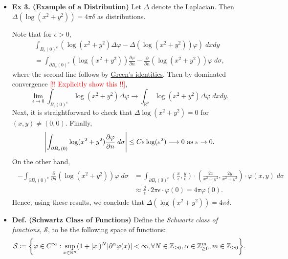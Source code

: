 \documentclass{article}
\begin{document}
\begin{itemize}
 	\item \textbf{Ex 3. (Example of a Distribution)} Let $\Delta$ denote the Laplacian. Then $\Delta(\log(x^{2} + y^{2})) = 4\pi \delta$ as distributions. 
 	
 		{\color{blue}
 			Note that for $\epsilon > 0$, 
 				\begin{multline}
					\int_{B_{\epsilon}(0)^{c}}\left(\log(x^{2} + y^{2})\Delta \varphi - \Delta(\log(x^{2} + y^{2}))\varphi\right)\;dx dy \\ = \int_{\partial B_{\epsilon}(0)^{c}}\left(\log(x^{2} + y^{2})\right)\frac{\partial \varphi}{\partial n} - \frac{\partial}{\partial n}\left(\log(x^{2} + y^{2})\right)\varphi\;d\sigma, 
 				\end{multline}
 			where the second line follows by \href{http://en.wikipedia.org/wiki/Green\%27s\_identities}{Green's identities}. Then by dominated convergence \textcolor{red}{[!! Explicitly show this !!]}, 
 				\begin{equation}
 					\lim_{\epsilon \to 0}\int_{B_{\epsilon}(0)^{c}}\log(x^{2} +  y^{2})\Delta \varphi \longrightarrow \int_{\mathbb{R}^{2}}\log(x^{2} +y^{2})\Delta\varphi\;dx dy. 
 				\end{equation}
 			Next, it is straightforward to check that $\Delta \log(x^{2} + y^{2}) = 0$ for $(x, y) \neq (0,0)$. Finally, 
 				\begin{equation}
 					\left| \int_{\partial B_{\varepsilon}(0)}\log(x^{2} + y^{2})\frac{\partial \varphi}{\partial n}\;d\sigma \right| 
 					\leq C\varepsilon \log(\varepsilon^{2}) \longrightarrow 0 \text{ as $\varepsilon \to 0$}. 
 				\end{equation}
 			On the other hand, 
 				\begin{align}
 					\begin{split}
 						-\int_{\partial B_{\epsilon}(0)^{c}}\frac{\partial}{\partial n}(\log(x^{2} + y^{2}))\varphi\;d\sigma &= \int_{\partial B_{\epsilon}(0)^{c}}\left(\frac{x}{\epsilon}, \frac{y}{\epsilon}\right) \cdot \left(\frac{2x}{x^{2} + y^{2}}, \frac{2y}{x^{2} + y^{2}}\right) \cdot \varphi(x,y)\;d\sigma \\
 						&\approx \frac{2}{\epsilon}\cdot 2\pi \epsilon \cdot \varphi(0) = 4\pi \varphi(0). 
 					\end{split}
 				\end{align}
 			Hence, using these results, we conclude that $\Delta(\log(x^{2} + y^{2})) = 4\pi \delta$. 
 		}
 		
 	\item \textbf{Def. (Schwartz Class of Functions)} Define the \textit{Schwartz class of functions}, $\mathcal{S}$, to be the following space of functions: 
 		\begin{equation}
 			\mathcal{S} \coloneqq \brac*{\varphi \in C^{\infty}: \sup_{x \in \mathbb{R}^{n}}(1 + |x|)^{N}|\partial^{\alpha}\varphi(x)| < \infty, \forall N \in \mathbb{Z}_{\geq 0}, \alpha \in \mathbb{Z}_{\geq 0}^{m}, m \in \mathbb{Z}_{\geq 0}}.
 		\end{equation}
 		

\end{itemize}
\end{document}
